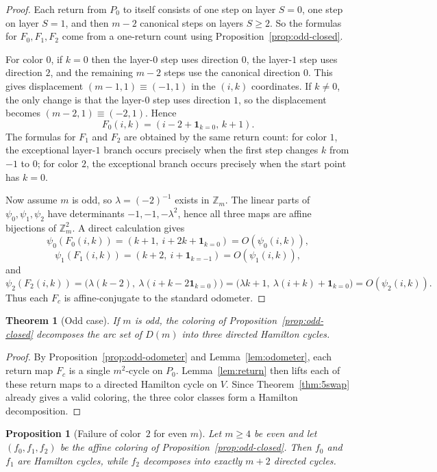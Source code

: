 \documentclass[11pt]{article}
\newtheorem{theorem}{Theorem}
\newtheorem{proposition}{Proposition}
\newcommand{\Zm}{\mathbb Z_m}
\begin{document}
\begin{proof}
Each return from $P_0$ to itself consists of one step on layer $S=0$, one step on layer $S=1$, and then $m-2$ canonical steps on layers $S\ge 2$.
So the formulas for $F_0,F_1,F_2$ come from a one-return count using Proposition~\ref{prop:odd-closed}.

For color $0$, if $k=0$ then the layer-$0$ step uses direction $0$, the layer-$1$ step uses direction $2$, and the remaining $m-2$ steps use the canonical direction $0$.
This gives displacement $(m-1,1)\equiv(-1,1)$ in the $(i,k)$ coordinates.
If $k\neq 0$, the only change is that the layer-$0$ step uses direction $1$, so the displacement becomes $(m-2,1)\equiv(-2,1)$.
Hence
\[
F_0(i,k)=(i-2+\mathbf 1_{k=0},\,k+1).
\]
The formulas for $F_1$ and $F_2$ are obtained by the same return count:
for color $1$, the exceptional layer-$1$ branch occurs precisely when the first step changes $k$ from $-1$ to $0$;
for color $2$, the exceptional branch occurs precisely when the start point has $k=0$.

Now assume $m$ is odd, so $\lambda=(-2)^{-1}$ exists in $\Zm$.
The linear parts of $\psi_0,\psi_1,\psi_2$ have determinants $-1,-1,-\lambda^2$, hence all three maps are affine bijections of $\Zm^2$.
A direct calculation gives
\[
\psi_0(F_0(i,k))
=
(k+1,\ i+2k+\mathbf 1_{k=0})
=
O(\psi_0(i,k)),
\]
\[
\psi_1(F_1(i,k))
=
(k+2,\ i+\mathbf 1_{k=-1})
=
O(\psi_1(i,k)),
\]
and
\[
\psi_2(F_2(i,k))
=
\bigl(\lambda(k-2),\ \lambda(i+k-2\mathbf 1_{k=0})\bigr)
=
\bigl(\lambda k+1,\ \lambda(i+k)+\mathbf 1_{k=0}\bigr)
=
O(\psi_2(i,k)).
\]
Thus each $F_c$ is affine-conjugate to the standard odometer.
\end{proof}

\begin{theorem}[Odd case]\label{thm:odd-hamilton}
If $m$ is odd, the coloring of Proposition~\ref{prop:odd-closed} decomposes the arc set of $D(m)$ into three directed Hamilton cycles.
\end{theorem}

\begin{proof}
By Proposition~\ref{prop:odd-odometer} and Lemma~\ref{lem:odometer}, each return map $F_c$ is a single $m^2$-cycle on $P_0$.
Lemma~\ref{lem:return} then lifts each of these return maps to a directed Hamilton cycle on $V$.
Since Theorem~\ref{thm:5swap} already gives a valid coloring, the three color classes form a Hamilton decomposition.
\end{proof}

\begin{proposition}[Failure of color~$2$ for even $m$]\label{prop:even-shatter}
Let $m\ge 4$ be even and let $(f_0,f_1,f_2)$ be the affine coloring of Proposition~\ref{prop:odd-closed}.
Then $f_0$ and $f_1$ are Hamilton cycles, while $f_2$ decomposes into exactly $m+2$ directed cycles.
\end{proposition}
\end{document}
